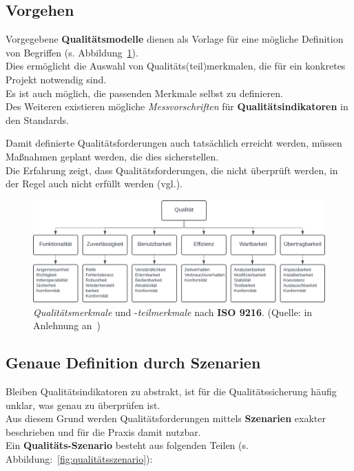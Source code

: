 \subsection*{Vorgehen}
Vorgegebene \textbf{Qualitätsmodelle} dienen als Vorlage für eine mögliche Definition von Begriffen (s. Abbildung~\ref{fig:qualitätsmerkmale}).\\
Dies ermöglicht die Auswahl von Qualitäts(teil)merkmalen, die für ein konkretes Projekt notwendig sind.\\
Es ist auch möglich, die passenden Merkmale selbst zu definieren.\\

\noindent
Des Weiteren existieren mögliche \textit{Messvorschriften} für \textbf{Qualitätsindikatoren} in den Standards.

\vspace{2mm}
\begin{tcolorbox}
    Damit definierte Qualitätsforderungen auch tatsächlich erreicht werden, müssen Maßnahmen geplant werden, die dies sicherstellen.\\
    Die Erfahrung zeigt, dass Qualitätsforderungen, die nicht überprüft werden, in der Regel auch nicht erfüllt werden (vgl.\cite[4]{Wed09c}).
\end{tcolorbox}
\vspace{2mm}


\begin{figure}
    \centering
    \includegraphics[scale=0.4]{part four/Qualität/img/qualitätsmerkmale}
    \caption{\textit{Qualitätsmerkmale} und -\textit{teilmerkmale} nach \textbf{ISO 9216}. (Quelle: in Anlehnung an~\cite[Abb. 1.2, 3]{Wed09c})}
    \label{fig:qualitätsmerkmale}
\end{figure}


\subsection*{Genaue Definition durch Szenarien}
Bleiben Qualitätsindikatoren zu abstrakt, ist für die Qualitätssicherung häufig unklar, was genau zu überprüfen ist.\\
Aus diesem Grund werden Qualitätsforderungen mittels \textbf{Szenarien} exakter beschrieben und für die Praxis damit nutzbar.\\
Ein \textbf{Qualitäts-Szenario} besteht aus folgenden Teilen (s. Abbildung:~\ref{fig:qualitätsszenario}):


